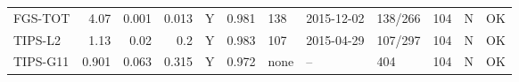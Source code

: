 \documentclass[10pt,a4paper]{article}
\begin{document}
\begin{longtable}{lrrrcrlllrcc}
FGS-TOT & 4.07 & 0.001 & 0.013 & Y & 0.981 & 138 & 2015-12-02 & 138/266 & 104 & N & OK\\
TIPS-L2 & 1.13 & 0.02 & 0.2 & Y & 0.983 & 107 & 2015-04-29 & 107/297 & 104 & N & OK\\
TIPS-G11 & 0.901 & 0.063 & 0.315 & Y & 0.972 & none & -- & 404 & 104 & N & OK\\

\end{longtable}
\end{document}
